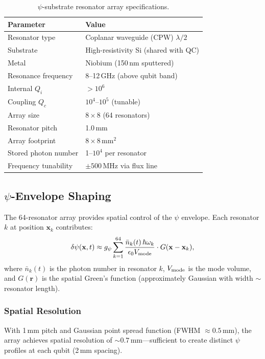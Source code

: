 \documentclass[11pt,letterpaper]{article}
\begin{document}
\begin{table}[H]
\caption{$\psi$-substrate resonator array specifications.}
\begin{tabular}{ll}
\toprule
\textbf{Parameter} & \textbf{Value} \\
\midrule
Resonator type & Coplanar waveguide (CPW) $\lambda/2$ \\
Substrate & High-resistivity Si (shared with QC) \\
Metal & Niobium (150\,nm sputtered) \\
Resonance frequency & 8--12\,GHz (above qubit band) \\
Internal $Q_i$ & $>10^6$ \\
Coupling $Q_c$ & $10^4$--$10^5$ (tunable) \\
Array size & $8 \times 8$ (64 resonators) \\
Resonator pitch & 1.0\,mm \\
Array footprint & $8 \times 8$\,mm$^2$ \\
Stored photon number & 1--$10^4$ per resonator \\
Frequency tunability & $\pm 500$\,MHz via flux line \\
\bottomrule
\end{tabular}
\end{table}

\subsection{$\psi$-Envelope Shaping}

The 64-resonator array provides spatial control of the $\psi$ envelope.
Each resonator $k$ at position $\mathbf{x}_k$ contributes:
\begin{equation}
\delta\psi(\mathbf{x}, t) \approx g_\psi \sum_{k=1}^{64}
\frac{\bar{n}_k(t)\,\hbar\omega_k}{\epsilon_0 V_{\rm mode}}
\cdot G(\mathbf{x} - \mathbf{x}_k),
\end{equation}
where $\bar{n}_k(t)$ is the photon number in resonator $k$, $V_{\rm mode}$
is the mode volume, and $G(\mathbf{r})$ is the spatial Green's function
(approximately Gaussian with width $\sim$ resonator length).

\subsubsection{Spatial Resolution}

With 1\,mm pitch and Gaussian point spread function (FWHM $\approx 0.5$\,mm),
the array achieves spatial resolution of $\sim 0.7$\,mm---sufficient to
create distinct $\psi$ profiles at each qubit (2\,mm spacing).
\end{document}
